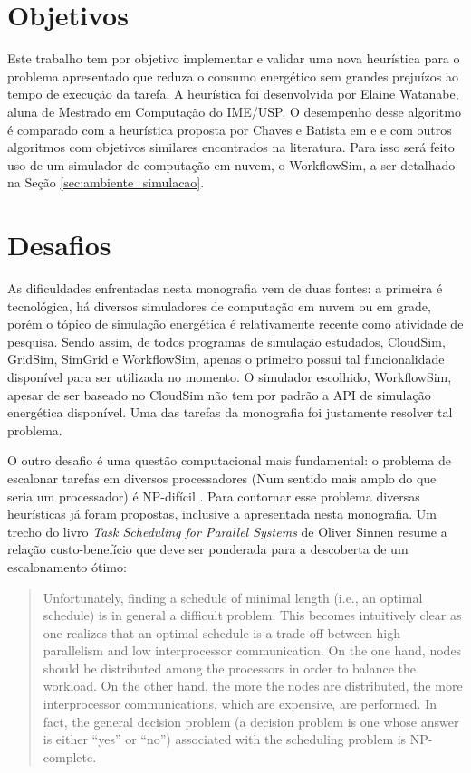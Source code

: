 \section{Objetivos}
\label{sec:objetivos}
Este trabalho tem por objetivo implementar e validar uma nova heurística para o
problema apresentado que reduza o consumo energético sem grandes prejuízos
ao tempo de execução da tarefa. A heurística foi desenvolvida por Elaine Watanabe, 
aluna de Mestrado em Computação do IME/USP. O desempenho desse algoritmo é
comparado com a heurística proposta por Chaves e Batista em
\cite{chaves:scheduling_software_requirements} e
\cite{batista:embedding_software_requirements} e com outros algoritmos com
objetivos similares encontrados na literatura. Para isso será feito uso de um
simulador de computação em nuvem, o WorkflowSim, a ser detalhado na Seção
\ref{sec:ambiente_simulacao}.


\section{Desafios}
\label{sec:desafios}
As dificuldades enfrentadas nesta monografia vem de duas fontes: a primeira é
tecnológica, há diversos simuladores de computação em nuvem ou em grade, porém
o tópico de simulação energética é relativamente recente como atividade de 
pesquisa. Sendo assim, de todos programas de simulação estudados, CloudSim, 
GridSim, SimGrid e WorkflowSim, apenas o primeiro possui tal funcionalidade
disponível para ser utilizada no momento. O simulador escolhido, WorkflowSim,
apesar de ser baseado no CloudSim  não tem por padrão a API de simulação energética
disponível. Uma das tarefas da monografia foi justamente resolver tal problema.

O outro desafio é uma questão computacional mais fundamental: o problema de 
escalonar tarefas em diversos processadores (Num sentido mais amplo do que seria
um processador) é NP-difícil \cite{sinnen:task_scheduling_parallel_systems}.
Para contornar esse problema diversas heurísticas já foram propostas, inclusive
a apresentada nesta monografia. Um trecho do livro
\emph{Task Scheduling for Parallel Systems} de Oliver Sinnen resume a relação
custo-benefício que deve ser ponderada para a descoberta de um escalonamento
ótimo:

\begin{quote}
	Unfortunately, finding a schedule of minimal length (i.e., an optimal schedule)
	is in general a difficult problem. This becomes intuitively clear as one realizes that
	an optimal schedule is a trade-off between high parallelism and low interprocessor
	communication. On the one hand, nodes should be distributed among the processors
	in order to balance the workload. On the other hand, the more the nodes are distributed,
	the more interprocessor communications, which are expensive, are performed. In fact,
	the general decision problem (a decision problem is one whose answer is either ``yes''
	or ``no'') associated with the scheduling problem is NP-complete. 
	\cite{sinnen:task_scheduling_parallel_systems}
\end{quote}



